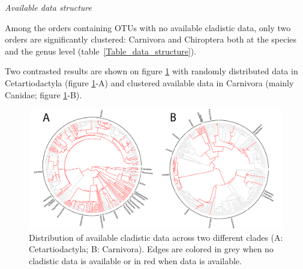 \documentclass[12pt,letterpaper]{article}
\renewcommand{\subsection}[1]{%
\bigskip
\begin{center}
\begin{large}
\normalfont\itshape #1
\end{large}
\end{center}}
\begin{document}
\renewcommand\baselinestretch{1.2}\selectfont
\begin{center}

\end{center}
\renewcommand\baselinestretch{2}\selectfont

\subsection{Available data structure}
Among the orders containing OTUs with no available cladistic data, only two orders are significantly clustered: Carnivora and Chiroptera both at the species and the genus level (table~\ref{Table_data_structure}).

\renewcommand\baselinestretch{1.2}\selectfont
\begin{center}

\end{center}
\renewcommand\baselinestretch{2}\selectfont

Two contrasted results are shown on figure \ref{Figure_example_coverage} with randomly distributed data in Cetartiodactyla (figure \ref{Figure_example_coverage}-A) and clustered available data in Carnivora (mainly Canidae; figure \ref{Figure_example_coverage}-B).

\begin{figure}[!htbp]
\centering
    \includegraphics[width=1\textwidth]{example_coverage.pdf}
\caption{Distribution of available cladistic data across two different clades (A: Cetartiodactyla; B: Carnivora).
Edges are colored in grey when no cladistic data is available or in red when data is available.}
\label{Figure_example_coverage}
\end{figure}


\end{document}
